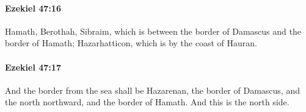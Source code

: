 		\paragraph{Ezekiel 47:16} %
			\label{EZEKIEL-47-16}

			Hamath, Berothah, Sibraim, which is between the border of Damascus and the border of Hamath; Hazarhatticon, which is by the coast of Hauran.


		\paragraph{Ezekiel 47:17} %
			\label{EZEKIEL-47-17}

			And the border from the sea shall be Hazarenan, the border of Damascus, and the north northward, and the border of Hamath. And this is the north side.


